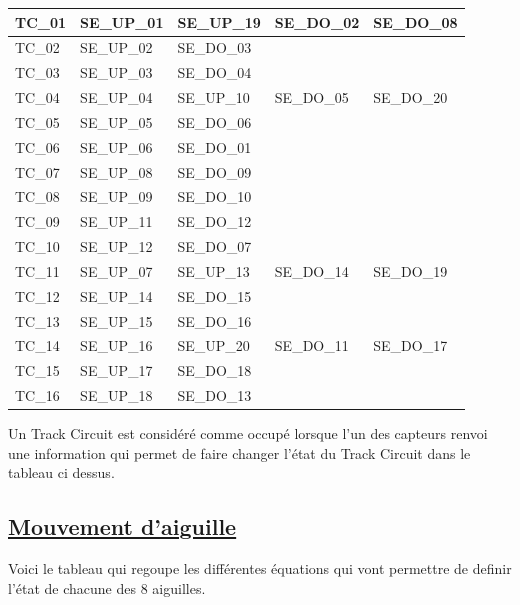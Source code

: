 \begin{center}
\begin{tabular}{|l||llll|}
  \hline
  TC\_01 & SE\_UP\_01 & SE\_UP\_19 & SE\_DO\_02 & SE\_DO\_08 \\
  \hline
  TC\_02 & SE\_UP\_02 & SE\_DO\_03 & & \\
  \hline
  TC\_03 & SE\_UP\_03 & SE\_DO\_04 & & \\
  \hline
  TC\_04 & SE\_UP\_04 & SE\_UP\_10 & SE\_DO\_05 & SE\_DO\_20 \\
  \hline
  TC\_05 & SE\_UP\_05 & SE\_DO\_06 & & \\
  \hline
  TC\_06 & SE\_UP\_06 & SE\_DO\_01 & & \\
  \hline
  TC\_07 & SE\_UP\_08 & SE\_DO\_09 & & \\
  \hline
  TC\_08 & SE\_UP\_09 & SE\_DO\_10 & & \\
  \hline
  TC\_09 & SE\_UP\_11 & SE\_DO\_12 & & \\
  \hline
  TC\_10 & SE\_UP\_12 & SE\_DO\_07 & & \\
  \hline
  TC\_11 & SE\_UP\_07 & SE\_UP\_13 & SE\_DO\_14 & SE\_DO\_19 \\
  \hline
  TC\_12 & SE\_UP\_14 & SE\_DO\_15 & & \\
  \hline
  TC\_13 & SE\_UP\_15 & SE\_DO\_16 & & \\
  \hline
  TC\_14 & SE\_UP\_16 & SE\_UP\_20 & SE\_DO\_11 & SE\_DO\_17 \\
  \hline
  TC\_15 & SE\_UP\_17 & SE\_DO\_18 & & \\
  \hline
  TC\_16 & SE\_UP\_18 & SE\_DO\_13 & & \\
  \hline
\end{tabular}
\end{center}

Un Track Circuit est considéré comme occupé lorsque l'un des capteurs
renvoi une information qui permet de faire changer l'état du Track
Circuit dans le tableau ci dessus.


\subsection{\underline{Mouvement d'aiguille}}
\label{sec:mvt_aig}

Voici le tableau qui regoupe les différentes équations qui vont
permettre de definir l'état de chacune des 8 aiguilles.


